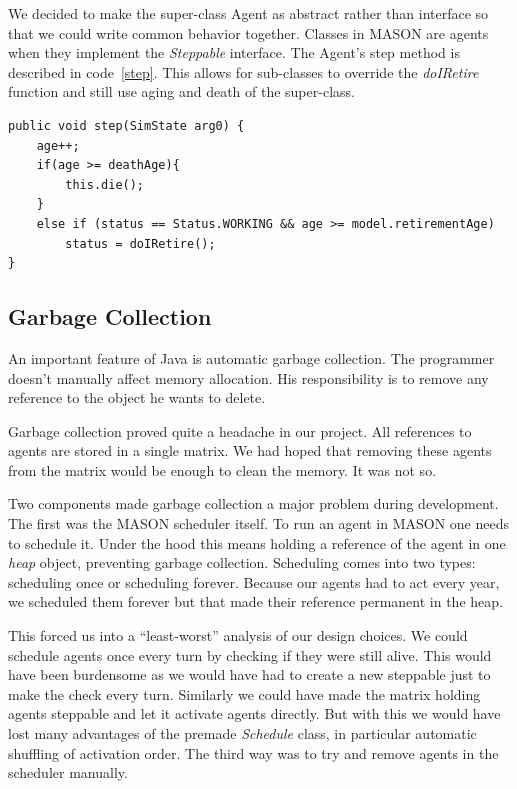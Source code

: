 \documentclass[runningheads,a4paper]{article}
\begin{document}
We decided to make the super-class Agent as abstract rather than interface so that we could write common behavior together.
Classes in MASON are agents when they implement the \textit{Steppable} interface.
The Agent's step method is described in code~\ref{step}.
This allows for sub-classes to override the \textit{doIRetire} function and still use aging and death of the super-class.
{
\linespread{1}
\begin{lstlisting}[float,caption= {Agent's step class}, label={step}]
public void step(SimState arg0) {
	age++;
	if(age >= deathAge){
		this.die();
	}
	else if (status == Status.WORKING && age >= model.retirementAge)	
		status = doIRetire();	
}

\end{lstlisting}
}

\subsection{Garbage Collection}

An important feature of Java is automatic garbage collection.
The programmer doesn't manually affect memory allocation. 
His responsibility is to remove any reference to the object he wants to delete.

Garbage collection proved quite a headache in our project.
All references to agents are stored in a single matrix.
We had hoped that removing these agents from the matrix would be enough to clean the memory.
It was not so.

Two components made garbage collection a major problem during development.
The first was the MASON scheduler itself.
To run an agent in MASON one needs to schedule it.
Under the hood this means holding a reference of the agent in one \textit{heap} object, preventing garbage collection.
Scheduling comes into two types: scheduling once or scheduling forever.
Because our agents had to act every year, we scheduled them forever but that made their reference permanent in the heap.

This forced us into a ``least-worst'' analysis of our design choices.
We could schedule agents once every turn by checking if they were still alive.
This would have been burdensome as we would have had to create a new steppable just to make the check every turn.
Similarly we could have made the matrix holding agents steppable and let it activate agents directly.
But with this we would have lost many advantages of the premade \textit{Schedule} class, in particular automatic shuffling of activation order.
The third way was to try and remove agents in the scheduler manually.
\end{document}
